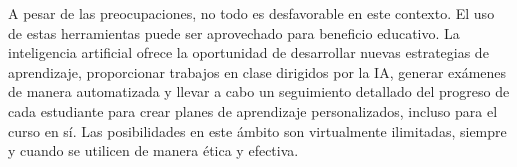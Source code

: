 \documentclass[letterpaper, 12pt]{article}
\begin{document}
A pesar de las preocupaciones, no todo es desfavorable en
este contexto. El uso de estas herramientas puede ser
aprovechado para beneficio educativo. La inteligencia
artificial ofrece la oportunidad de desarrollar nuevas
estrategias de aprendizaje, proporcionar trabajos en clase
dirigidos por la IA, generar exámenes de manera
automatizada y llevar a cabo un seguimiento detallado del
progreso de cada estudiante para crear planes de
aprendizaje personalizados, incluso para el curso en sí.
Las posibilidades en este ámbito son virtualmente
ilimitadas, siempre y cuando se utilicen de manera ética y
efectiva.

\newpage

\printbibliography
\end{document}
